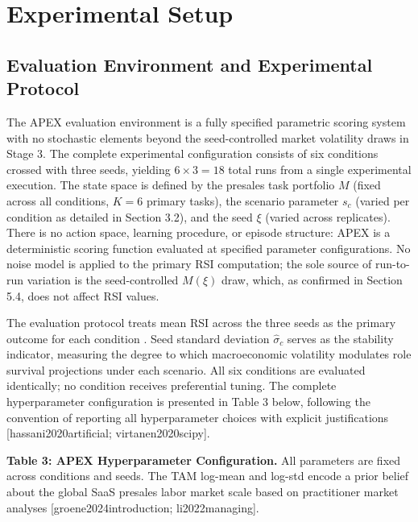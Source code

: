 \documentclass[10pt, conference]{IEEEtran}
\begin{document}
\section{Experimental Setup}

\label{sec:experimental_setup}

\subsection{Evaluation Environment and Experimental Protocol}

\label{sec:evaluation_environment_and_experimental_}

The APEX evaluation environment is a fully specified parametric scoring system with no stochastic elements beyond the seed-controlled market volatility draws in Stage 3. The complete experimental configuration consists of six conditions crossed with three seeds, yielding $6 \times 3 = 18$ total runs from a single experimental execution. The state space is defined by the presales task portfolio $M$ (fixed across all conditions, $K = 6$ primary tasks), the scenario parameter $s_c$ (varied per condition as detailed in Section 3.2), and the seed $\xi$ (varied across replicates). There is no action space, learning procedure, or episode structure: APEX is a deterministic scoring function evaluated at specified parameter configurations. No noise model is applied to the primary RSI computation; the sole source of run-to-run variation is the seed-controlled $M(\xi)$ draw, which, as confirmed in Section 5.4, does not affect RSI values.

The evaluation protocol treats mean RSI across the three seeds as the primary outcome for each condition \cite{wiser2021expert}. Seed standard deviation $\hat{\sigma}_c$ serves as the stability indicator, measuring the degree to which macroeconomic volatility modulates role survival projections under each scenario. All six conditions are evaluated identically; no condition receives preferential tuning. The complete hyperparameter configuration is presented in Table 3 below, following the convention of reporting all hyperparameter choices with explicit justifications [hassani2020artificial; virtanen2020scipy].

\textbf{Table 3: APEX Hyperparameter Configuration.} All parameters are fixed across conditions and seeds. The TAM log-mean and log-std encode a prior belief about the global SaaS presales labor market scale based on practitioner market analyses [groene2024introduction; li2022managing].
\end{document}
